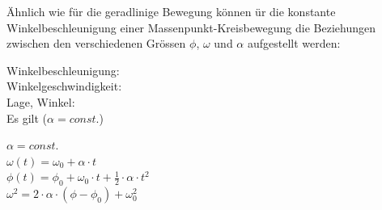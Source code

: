Ähnlich wie für die geradlinige Bewegung können 
ür die konstante Winkelbeschleunigung einer Massenpunkt-Kreisbewegung
die Beziehungen zwischen den verschiedenen Grössen $\phi$, $\omega$ und $\alpha$
aufgestellt werden:

\begin{equbox}
    \begin{minipage}{.25\textwidth}
        Winkelbeschleunigung: \\
        Winkelgeschwindigkeit: \\
        Lage, Winkel: \\
        Es gilt ($\alpha = const.$)
    \end{minipage}
    \hspace{.1\textwidth}
    \begin{minipage}{.3\textwidth}
        $\alpha = const.$ \\
        $\omega(t) = \omega_0 + \alpha \cdot t$ \\
        $\phi(t) = \phi_0 + \omega_0 \cdot t + \frac{1}{2} \cdot \alpha \cdot t^2$ \\
        $\omega^2 = 2 \cdot \alpha \cdot (\phi - \phi_0) + \omega_{0}^2$
    \end{minipage}
\end{equbox}


